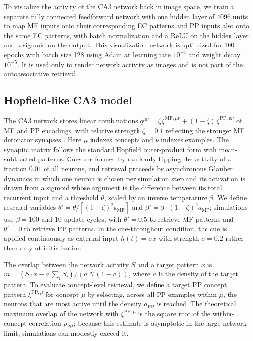 \documentclass[11pt]{article}
\begin{document}
To visualize the activity of the CA3 network back in image space, we train a
separate fully connected feedforward network with one hidden layer of 4096
units to map MF inputs onto their corresponding EC patterns and PP inputs
also onto the same EC patterns, with batch normalization and a ReLU on the
hidden layer and a sigmoid on the output. This visualization network is
optimized for 100 epochs with batch size 128 using Adam at learning rate
$10^{-4}$ and weight decay $10^{-5}$. It is used only to render network
activity as images and is not part of the autoassociative retrieval.

\subsection{Hopfield-like CA3 model}

The CA3 network stores linear combinations
$q^{\mu\nu} = \zeta\, \xi^{\mathrm{MF},\mu\nu} + (1-\zeta)\, \xi^{\mathrm{PP},\mu\nu}$
of MF and PP encodings, with relative strength $\zeta = 0.1$ reflecting the
stronger MF detonator synapses \cite{hopfield1982neural,tsodyks1988enhanced}.
Here $\mu$ indexes concepts and $\nu$ indexes examples. The synaptic matrix
follows the standard Hopfield outer-product form with mean-subtracted
patterns. Cues are formed by randomly flipping the activity of a fraction
$0.01$ of all neurons, and retrieval proceeds by asynchronous Glauber
dynamics \cite{amit1985spin} in which one neuron is chosen per simulation
step and its activation is drawn from a sigmoid whose argument is the
difference between its total recurrent input and a threshold $\theta$,
scaled by an inverse temperature $\beta$. We define rescaled variables
$\theta' = \theta / \left[(1-\zeta)^2 a_{\mathrm{MF}}\right]$ and
$\beta' = \beta \cdot (1-\zeta)^2 a_{\mathrm{MF}}$; simulations use $\beta = 100$
and 10 update cycles, with $\theta' = 0.5$ to retrieve MF patterns and
$\theta' = 0$ to retrieve PP patterns. In the cue-throughout condition,
the cue is applied continuously as external input $h(t) = \sigma x$ with
strength $\sigma = 0.2$ rather than only at initialization.

The overlap between the network activity $S$ and a target pattern $x$ is
$m = (S \cdot x - a\, \sum_i S_i)/(a\, N\, (1-a))$, where $a$ is the density
of the target pattern. To evaluate concept-level retrieval, we define a
target PP concept pattern $\xi^{\mathrm{PP},\mu}$ for concept $\mu$ by
selecting, across all PP examples within $\mu$, the neurons that are most
active until the density $a_{\mathrm{PP}}$ is reached. The theoretical
maximum overlap of the network with $\xi^{\mathrm{PP},\mu}$ is the square
root of the within-concept correlation $\rho_{\mathrm{PP}}$; because this
estimate is asymptotic in the large-network limit, simulations can modestly
exceed it.
\end{document}
